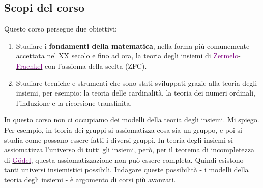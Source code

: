 \documentclass[11pt]{scrartcl}
\begin{document}
\subsection{Scopi del corso}
Questo corso persegue due obiettivi:
\begin{enumerate}[(1)]
	\item Studiare i \textbf{fondamenti della matematica}, nella forma più comunemente accettata nel XX secolo e fino ad ora, la teoria degli insiemi di 
	\href{https://it.wikipedia.org/wiki/Ernst_Zermelo}{\textcolor{purple}{Zermelo}}-\href{https://it.wikipedia.org/wiki/Adolf_Abraham_Halevi_Fraenkel}{\textcolor{purple}{Fraenkel}} con l'assioma della scelta (ZFC).
	\item Studiare tecniche e strumenti che sono stati sviluppati grazie alla teoria degli insiemi, per esempio: la teoria delle cardinalità, la teoria dei numeri ordinali, l'induzione e la ricorsione transfinita.
\end{enumerate}

In questo corso non ci occupiamo dei modelli della teoria degli insiemi. Mi spiego. Per esempio, in teoria dei gruppi si assiomatizza cosa sia un gruppo, e poi si studia come possano essere fatti i diversi gruppi. In 
teoria degli insiemi si assiomatizza l'universo di tutti gli insiemi, però, per il teorema di incompletezza di \href{https://it.wikipedia.org/wiki/Kurt_G%C3%B6del}{\textcolor{purple}{Gödel}}, questa assiomatizzazione non 
può essere completa. Quindi esistono tanti universi insiemistici possibili. Indagare queste possibilità - i modelli della teoria degli insiemi - è argomento di corsi più avanzati.

\newpage
\end{document}
